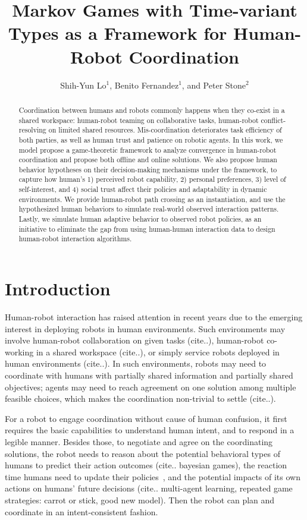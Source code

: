 \documentclass[letterpaper, 10 pt, conference]{ieeeconf}  %
\title{\LARGE \bf
Markov Games with Time-variant Types as a Framework for Human-Robot Coordination
}
\author{Shih-Yun Lo$^{1}$, Benito Fernandez$^{1}$, and Peter Stone$^{2}$%
}
\begin{document}
\maketitle
\thispagestyle{empty}
\pagestyle{empty}
\begin{abstract}
  Coordination between humans and robots commonly happens when they 
  co-exist in a shared workspace: human-robot teaming on collaborative tasks, 
  human-robot conflict-resolving on limited shared resources. Mis-coordination 
  deteriorates task 
  efficiency of both parties, as well as human trust and patience on robotic 
  agents. In this work, we model propose a game-theoretic framework to analyze convergence in 
  human-robot coordination and propose both offline and online solutions.
  We also propose human behavior hypotheses on their 
  decision-making mechanisms under the framework, 
  to capture how human's 1) perceived robot 
  capability, 2) personal preferences, 3) level of self-interest, and 4) social 
  trust affect their policies and adaptability in dynamic environments. 
  We provide human-robot path crossing as an instantiation, and use the 
  hypothesized human behaviors to simulate real-world observed interaction 
  patterns. Lastly, we simulate human adaptive behavior to observed robot 
  policies, as 
  an initiative to eliminate the gap from using human-human interaction data 
  to design human-robot interaction algorithms. 
\end{abstract}

\section{Introduction}
Human-robot interaction has raised attention in recent years due to the 
emerging interest in deploying robots in human environments. Such 
environments may involve human-robot collaboration on given tasks (cite..), 
human-robot co-working in a shared workspace (cite..), or simply service 
robots deployed in human environments (cite..). In such environments, robots 
may need to coordinate with humans with partially shared information and 
partially shared objectives; agents may need to reach agreement on one 
solution among multiple feasible choices, which makes the coordination non-trivial to 
settle (cite..). 

For a robot to engage coordination without cause of human confusion, it first 
requires the basic capabilities to understand human intent, and to respond in a 
legible manner. Besides those, to negotiate and agree on the coordinating 
solutions, the robot needs to reason about the potential behavioral types of humans to predict 
their action outcomes (cite.. bayesian games), the reaction time humans need 
to update their policies~\cite{shah2011improved}, and the potential 
impacts of its own actions on humans' future decisions (cite.. multi-agent 
learning, repeated game strategies: carrot or stick, good new model). Then the 
robot can plan and coordinate in an intent-consistent fashion. 
\end{document}
